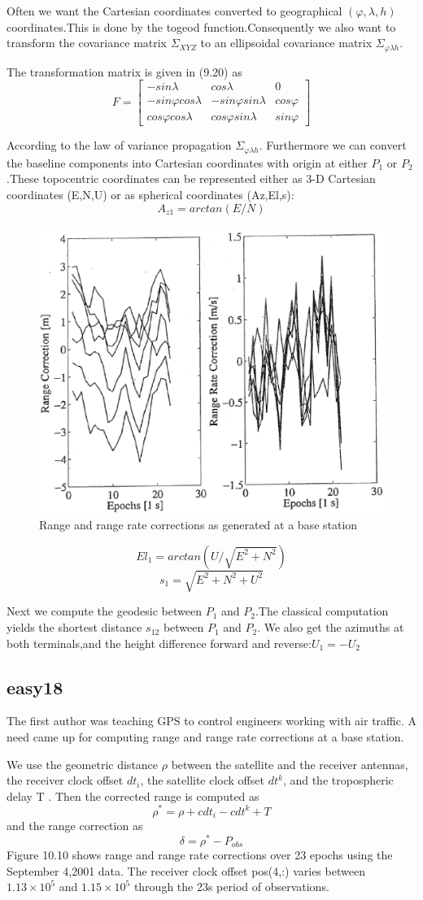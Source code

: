 Often we want the Cartesian coordinates converted to geographical $(\varphi,\lambda,h)$ coordinates.This is done by the togeod function.Consequently we also want to transform the covariance matrix $\Sigma_{XYZ}$ to an ellipsoidal covariance matrix $\Sigma_{\varphi\lambda h}$.

The transformation matrix is given in (9.20) as
$$
F=
\begin{bmatrix}
-sin\lambda&cos\lambda&0\\
-sin\varphi cos\lambda&-sin\varphi sin\lambda&cos\varphi\\
cos\varphi cos\lambda&cos\varphi sin\lambda&sin\varphi
\end{bmatrix}
$$

According to the law of variance propagation $\Sigma_{\varphi\lambda h}$. Furthermore we can convert the baseline components into Cartesian coordinates with origin at either $P_{1}$ or $P_{2}$.These topocentric coordinates can be represented either as 3-D Cartesian coordinates (E,N,U) or as spherical coordinates (Az,El,s):
$$
A_{z1}=arctan(E/N)
$$

\begin{figure}
	\centering
	\includegraphics[width=0.4\linewidth]{TeX_files/Part03/chapter10/image/9-10}
	\caption{Range and range rate corrections as generated at a base station}
	\label{fig:9-10}
\end{figure}

$$
El_{1}=arctan(U/\sqrt{E^{2}+N^{2}})
$$
$$
s_{1}=\sqrt{E^{2}+N^{2}+U^{2}}
$$

Next we compute the geodesic between $P_{1}$ and $P^{}_{2}$.The classical computation yields the shortest distance $s_{12}$ between $P_{1}$ and $P_{2}$. We also get the azimuths at both terminals,and the height difference forward and reverse:$U_{1}=-U_{2}$

\subsection{easy18}

The first author was teaching GPS to control engineers working with air traffic. A need came up for computing range and range rate corrections at a base station.

We use the geometric distance $\rho$ between the satellite and the receiver antennas, the receiver clock offset $dt_{i}$, the satellite clock offset $dt^{k}$, and the tropospheric delay T . Then the corrected range is computed as
$$
\rho^{*}=\rho+cdt_{i}-cdt^{k}+T
$$
and the range correction as
$$
\delta=\rho^{*}-P_{obs}
$$
Figure 10.10 shows range and range rate corrections over 23 epochs using the September 4,2001 data. The receiver clock offset pos(4,:) varies between $1.13 \times 10^{5}$ and $1.15 \times 10^{5}$
through the 23s period of observations.